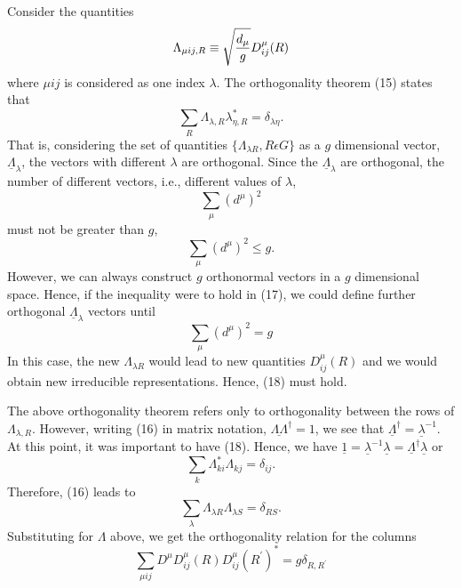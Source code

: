 Consider the quantities
\begin{equation}
\Lambda_{\mu ij,R} \equiv \sqrt{{d_{\mu} \over g}} D^{\mu}_{ij} (R)
\end{equation}
where $\mu ij$ is considered as one index $\lambda$.  The 
orthogonality theorem (15) states that
\begin{equation}
\sum_{R} \Lambda_{\lambda,R} \lambda^*_{\eta,R}  = \delta_{\lambda 
\eta}.
\label{chap16app-eqno16}
\end{equation}
That is, considering the set of quantities $\{ \Lambda_{\lambda R},R 
\epsilon G\}$ as a $g$ dimensional vector, 
$\underline{\Lambda}_{\lambda}$, the vectors with different $\lambda$ 
are orthogonal.  Since the $\underline{\Lambda}_{\lambda}$ are 
orthogonal, the number of different vectors, i.e., different values 
of $\lambda$,
\begin{equation}
\sum_{\mu} \left( d^{\mu} \right)^2
\end{equation}
must not be greater than $g$,
\begin{equation}
\sum_{\mu} \left( d^{\mu} \right)^2 \leq g.
\label{chap16app-eqno17}
\end{equation}
However, we can always construct $g$ orthonormal vectors in a $g$ 
dimensional space.  Hence, if the inequality were to hold in (17), we 
could define further orthogonal $\underline{\Lambda}_{\lambda}$ 
vectors until
\begin{equation}
\sum_{\mu} \left( d^{\mu} \right)^2 = g
\label{chap16app-eqno18}
\end{equation}
In this case, the new $\Lambda_{\lambda R}$ would lead to new 
quantities $D^{\mu}_{ij}(R)$ and we would obtain new irreducible 
representations.  Hence, (18) must hold.

The above orthogonality theorem refers only to orthogonality between 
the rows of $\Lambda_{\lambda,R}$.  However, writing (16) in matrix 
notation, $\underline{\Lambda \Lambda}^{\dag} = 1$, we see that 
$\underline{\Lambda}^{\dag} = \underline{\lambda}^{-1}$.  At this 
point, it was important to have (18).  Hence, we have 
$\underline{1} = \underline{\lambda}^{-1} \underline{\lambda} = 
\underline{\Lambda}^{\dag} \underline{\lambda}$ or
\begin{equation}
\sum_{k} \Lambda^*_{ki} \Lambda_{kj} = \delta_{ij}.
\end{equation}
Therefore, (16) leads to
\begin{equation}
\sum_{\lambda} \Lambda_{\lambda R} \Lambda_{\lambda S} = \delta_{RS}.
\end{equation}
Substituting for $\Lambda$ above, we get the orthogonality relation 
for the columns
\begin{equation}
\sum_{\mu ij} D^{\mu} D^{\mu}_{ij} (R) D^{\mu}_{ij} \left( R^{\prime} 
\right)^* = g \delta_{R,R^{\prime}}
\end{equation}

